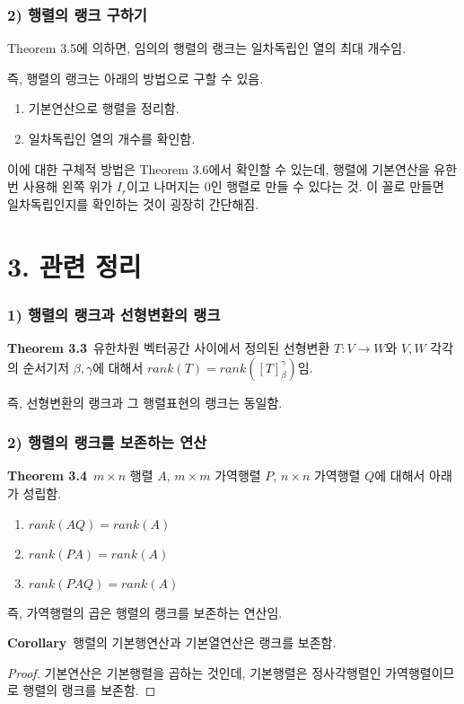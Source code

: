 \documentclass[10pt, a4paper]{article}
\begin{document}
\subsubsection*{2) 행렬의 랭크 구하기}
Theorem 3.5에 의하면, 임의의 행렬의 랭크는 일차독립인 열의 최대 개수임.

즉, 행렬의 랭크는 아래의 방법으로 구할 수 있음.
\begin{enumerate}
    \item 기본연산으로 행렬을 정리함.
    \item 일차독립인 열의 개수를 확인함.
\end{enumerate}

이에 대한 구체적 방법은 Theorem 3.6에서 확인할 수 있는데, 행렬에 기본연산을 유한 번 사용해 왼쪽 위가 $I_r$이고 나머지는 0인 행렬로 만들 수 있다는 것. 이 꼴로 만들면 일차독립인지를 확인하는 것이 굉장히 간단해짐.


\section*{3. 관련 정리}
\subsubsection*{1) 행렬의 랭크과 선형변환의 랭크}
\textbf{Theorem 3.3}\, 유한차원 벡터공간 사이에서 정의된 선형변환 $T:V \rightarrow W$와 $V,W$ 각각의 순서기저 $\beta, \gamma$에 대해서 $rank(T)=rank([T]^{\gamma}_{\beta})$임.

즉, 선형변환의 랭크과 그 행렬표현의 랭크는 동일함.

\subsubsection*{2) 행렬의 랭크를 보존하는 연산}
\textbf{Theorem 3.4}\, $m \times n$ 행렬 $A$, $m \times m$ 가역행렬 $P$, $n \times n$ 가역행렬 $Q$에 대해서 아래가 성립함.

\begin{enumerate}
    \item $rank(AQ)=rank(A)$
    \item $rank(PA)=rank(A)$
    \item $rank(PAQ)=rank(A)$
\end{enumerate}

즉, 가역행렬의 곱은 행렬의 랭크를 보존하는 연산임.

\textbf{Corollary}\, 행렬의 기본행연산과 기본열연산은 랭크를 보존함.

\begin{proof}
기본연산은 기본행렬을 곱하는 것인데, 기본행렬은 정사각행렬인 가역행렬이므로 행렬의 랭크를 보존함.
\end{proof}
\end{document}
